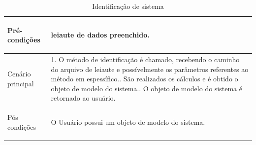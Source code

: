 \begin{table}[H]
\begin{center}
\begin{tabularx}{\textwidth}{|>{\bfseries\raggedright\arraybackslash\center}m{5cm}|X|}
            Pré-condições                                   & leiaute de dados preenchido.                                                                                                                                                                                                                                                                          \\ \hline
            Cenário principal                               & 1. O método de identificação é chamado, recebendo o caminho do arquivo de leiaute e possívelmente os parâmetros referentes ao método em espessífico.\newline 2. São realizados os cálculos e é obtido o objeto de modelo do sistema.\newline 3. O objeto de modelo do sistema é retornado ao usuário. \\ \hline
            Pós condições                                   & O Usuário possui um objeto de modelo do sistema.                                                                                                                                                                                                                                                     \\ \hline
        \end{tabularx}
        \caption{Identificação de sistema}
        \label{tab:uc2}
    \end{center}
\end{table}

